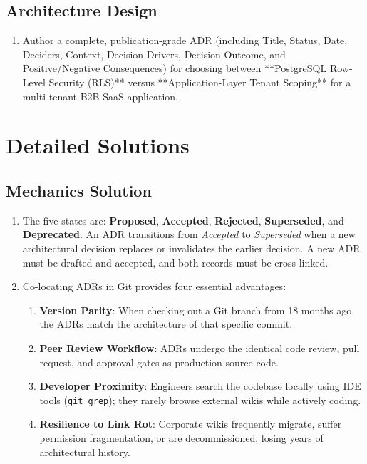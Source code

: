 \subsection*{Architecture Design}
\begin{enumerate}[leftmargin=18pt]
  \item Author a complete, publication-grade ADR (including Title, Status, Date, Deciders, Context, Decision Drivers, Decision Outcome, and Positive/Negative Consequences) for choosing between **PostgreSQL Row-Level Security (RLS)** versus **Application-Layer Tenant Scoping** for a multi-tenant B2B SaaS application.
\end{enumerate}

\section{Detailed Solutions}

\subsection*{Mechanics Solution}
\begin{enumerate}[leftmargin=18pt]
  \item The five states are: \textbf{Proposed}, \textbf{Accepted}, \textbf{Rejected}, \textbf{Superseded}, and \textbf{Deprecated}. 
  An ADR transitions from \textit{Accepted} to \textit{Superseded} when a new architectural decision replaces or invalidates the earlier decision. A new ADR must be drafted and accepted, and both records must be cross-linked.
  
  \item Co-locating ADRs in Git provides four essential advantages:
  \begin{enumerate}
    \item \textbf{Version Parity}: When checking out a Git branch from 18 months ago, the ADRs match the architecture of that specific commit.
    \item \textbf{Peer Review Workflow}: ADRs undergo the identical code review, pull request, and approval gates as production source code.
    \item \textbf{Developer Proximity}: Engineers search the codebase locally using IDE tools (\texttt{git grep}); they rarely browse external wikis while actively coding.
    \item \textbf{Resilience to Link Rot}: Corporate wikis frequently migrate, suffer permission fragmentation, or are decommissioned, losing years of architectural history.
  \end{enumerate}
\end{enumerate}

